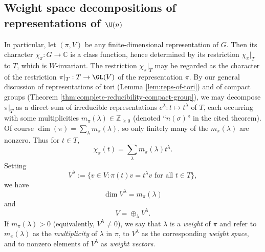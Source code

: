 \documentclass[reqno]{amsart} 
\begin{document}
\subsection{Weight space decompositions
  of representations of \texorpdfstring{$\U(n)$}{U(n)}}\label{sec:weight-decmop-U-n}
In particular, let $(\pi,V)$ be any finite-dimensional representation of $G$.  Then its character $\chi_\pi : G \rightarrow \mathbb{C}$ is a class function, hence determined by its restriction $\chi_\pi|_{T}$ to $T$, which is $W$-invariant.  The restriction $\chi_{\pi}|_{T}$ may be regarded as the character of the restriction $\pi|_T : T \rightarrow \GL(V)$ of the representation $\pi$.  By our general discussion of representations of tori (Lemma \ref{lem:reps-of-tori}) and of compact groups (Theorem \ref{thm:complete-reducibility-compact-group}), we may decompose $\pi|_T$ as a direct sum of irreducible representations $e^\lambda : t \mapsto t^\lambda$ of $T$, each occurring with some multiplicities $m_\pi(\lambda) \in \mathbb{Z}_{\geq 0}$ (denoted ``$n(\sigma)$'' in the cited theorem).  Of course $\dim(\pi) = \sum _{\lambda} m_\pi (\lambda)$, so only finitely many of the $m_\pi(\lambda)$ are nonzero.  Thus for $t \in T$,
\begin{equation*}
  \chi_\pi(t)
  =
  \sum_{\lambda}
  m_\pi(\lambda) t^\lambda.
\end{equation*}
Setting
\begin{equation*}
V^{\lambda} := \{v \in V : \pi(t) v = t^\lambda v \text{ for all } t \in T\},
\end{equation*}
 we have 
\begin{equation*}
\dim V^{\lambda} = m_\pi(\lambda)
\end{equation*}
 and
\begin{equation*}
V = \oplus_{\lambda} V^{\lambda}.
\end{equation*}
 If $m_\pi(\lambda) > 0$ (equivalently, $V^{\lambda} \neq 0$), we say that $\lambda$ is a \emph{weight} of $\pi$ and refer to $m_\pi(\lambda)$ as the \emph{multiplicity} of $\lambda$ in $\pi$, to $V^{\lambda}$ as the corresponding \emph{weight space}, and to nonzero elements of $V^{\lambda}$ as \emph{weight vectors}.
\end{document}
